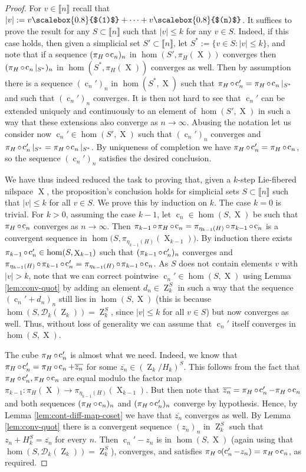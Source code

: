 \documentclass[a4paper,12pt,reqno]{amsart}
\theoremstyle{definition}
\def\to{\rightarrow}
\newcommand*{\sbr}[1]{\scalebox{0.8}{$(#1)$}}
\newcommand*{\db}[1]{\llbracket #1\rrbracket}
\newcommand{\mc}{\mathcal}
\DeclareMathOperator{\ab}{Z}
\DeclareMathOperator{\q}{c}
\DeclareMathOperator{\ns}{X}
\DeclareMathOperator{\co}{\circ\hspace{-0.02 cm}}
\begin{document}
\begin{proof}
For $v\in \db{n}$ recall that $|v|:=v\sbr{1}+\cdots+v\sbr{n}$. It suffices to prove the result for any $S\subset \db{n}$ such that $|v|\le k$ for any $v\in S$. Indeed, if this case holds, then given a simplicial set $S'\subset \db{n}$, let $S^*:=\{v\in S:|v|\le k\}$, and note that if a  sequence $(\pi_H\co \q_n)_n$ in $\hom({S'},\pi_H(\ns))$ converges then $(\pi_H\co\q_n|_{S^*})_n$ in $\hom({S^*},\pi_H(\ns))$  converges as well. Then by assumption there is a sequence $(\q_n')_n$ in $\hom({S^*},\ns)$ such that $\pi_H\co\q_n' = \pi_H\co\q_n|_{S^*}$ and such that $(\q_n')_n$ converges. It is then not hard to see that $\q_n'$ can be extended uniquely and continuously to an element of $\hom({S'},\ns)$ in such a way that these extensions also converge as $n\to\infty$. Abusing the notation let us consider now $\q_n'\in \hom({S'},\ns)$ such that $(\q_n')_n$ converges and $\pi_H\co\q_n'|_{S^*} = \pi_H\co \q_n|_{S^*}$. By uniqueness of completion we have  $\pi_H\co\q_n' = \pi_H\co \q_n$, so the sequence $(\q_n')_n$ satisfies the desired conclusion.

We have thus indeed reduced the task to proving that, given a $k$-step Lie-fibered nilspace $\ns$, the proposition's conclusion holds for simplicial sets $S\subset \db{n}$ such that $|v|\le k$ for all $v\in S$. We prove this by induction on $k$. The case $k=0$ is trivial. For $k>0$, assuming the case $k-1$, let $\q_n\in \hom(S,\ns)$ be such that $\pi_H\co\q_n$ converges as $n\to\infty$. Then $\pi_{k-1}\co\pi_H\co\q_n = \pi_{\eta_{k-1}(H)}\co \pi_{k-1}\co \q_n$ is a convergent sequence in $\hom\big(S,\pi_{\eta_{k-1}(H)}(\ns_{k-1})\big)$. By induction there exists $\pi_{k-1}\co \q_n'\in \hom(S,\ns_{k-1})$ such that $(\pi_{k-1}\co\q_n')_n$ converges and $\pi_{\eta_{k-1}(H)} \co \pi_{k-1}\co \q_n' = \pi_{\eta_{k-1}(H)}\co \pi_{k-1}\co \q_n$. As $S$ does not contain elements $v$ with $|v|>k$, note that we can correct pointwise $\q_n'\in \hom(S,\ns)$ using Lemma \ref{lem:conv-quot} by adding an element $d_n\in \ab_k^S$ in such a way that the sequence $(\q_n'+d_n)_n$ still lies in $\hom(S,\ns)$ (this is because $\hom(S,\mc{D}_k(\ab_k))=\ab_k^S$, since $|v|\le k$ for all $v\in S$) but now converges as well. Thus, without loss of generality we can assume that $\q_n'$ itself converges in $\hom(S,\ns)$.

The cube $\pi_H\co\q_n'$ is almost what we need. Indeed, we know that $\pi_H\co\q_n' = \pi_H\co \q_n+\overline{z_n}$ for some $\overline{z_n}\in (\ab_k/H_k)^{S}$. This follows from the fact that $\pi_H\co\q_n', \pi_H\co \q_n$ are equal modulo the factor map $\pi_{k-1}:\pi_H(\ns)\to \pi_{\eta_{k-1}(H)}(\ns_{k-1})$. But then note that $\overline{z_n} = \pi_H\co\q_n'-\pi_H\co \q_n$ and both sequences $(\pi_H\co \q_n)_n$ and $(\pi_H\co \q_n')_n$ converge by hypothesis. Hence, by Lemma \ref{lem:cont-diff-map-coset} we have that $\overline{z_n}$ converges as well. By Lemma \ref{lem:conv-quot} there is a convergent sequence $(z_n)_n$ in $\ab_k^S$ such that $z_n+H_k^S = \overline{z_n}$ for every $n$. Then $\q_n'-z_n$ is in $\hom(S,\ns)$ (again using that $\hom(S,\mc{D}_k(\ab_k))=\ab_k^S$), converges, and satisfies $\pi_H\co (\q_n'-z_n)=\pi_H\co \q_n$, as required.
\end{proof}
\end{document}
